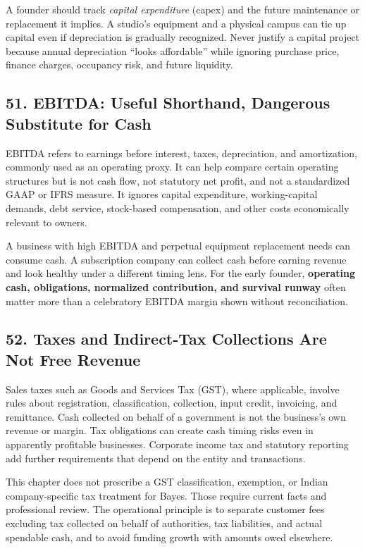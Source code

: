 A founder should track \emph{capital expenditure} (capex) and the future maintenance or replacement it implies. A studio's equipment and a physical campus can tie up capital even if depreciation is gradually recognized. Never justify a capital project because annual depreciation ``looks affordable'' while ignoring purchase price, finance charges, occupancy risk, and future liquidity.

\subsection*{51. EBITDA: Useful Shorthand, Dangerous Substitute for Cash}

EBITDA refers to earnings before interest, taxes, depreciation, and amortization, commonly used as an operating proxy. It can help compare certain operating structures but is not cash flow, not statutory net profit, and not a standardized GAAP or IFRS measure. It ignores capital expenditure, working-capital demands, debt service, stock-based compensation, and other costs economically relevant to owners.

A business with high EBITDA and perpetual equipment replacement needs can consume cash. A subscription company can collect cash before earning revenue and look healthy under a different timing lens. For the early founder, \textbf{operating cash, obligations, normalized contribution, and survival runway} often matter more than a celebratory EBITDA margin shown without reconciliation.

\subsection*{52. Taxes and Indirect-Tax Collections Are Not Free Revenue}

Sales taxes such as Goods and Services Tax (GST), where applicable, involve rules about registration, classification, collection, input credit, invoicing, and remittance. Cash collected on behalf of a government is not the business's own revenue or margin. Tax obligations can create cash timing risks even in apparently profitable businesses. Corporate income tax and statutory reporting add further requirements that depend on the entity and transactions.

This chapter does not prescribe a GST classification, exemption, or Indian company-specific tax treatment for Bayes. Those require current facts and professional review. The operational principle is to separate customer fees excluding tax collected on behalf of authorities, tax liabilities, and actual spendable cash, and to avoid funding growth with amounts owed elsewhere.

